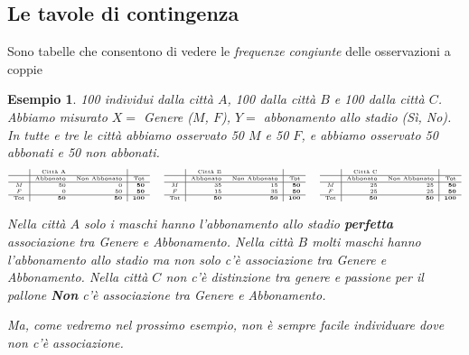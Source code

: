\documentclass[
  11pt,
]{book}
\theoremstyle{mytheoremstyle}
\theoremstyle{mydefstyle}
\newtheorem{example}{{Esempio}}[section]
\begin{document}
\subsection{Le tavole di contingenza}\label{le-tavole-di-contingenza}

Sono tabelle che consentono di vedere le \emph{frequenze congiunte} delle osservazioni a coppie

\begin{example}
100 individui dalla città \(A\), 100 dalla città \(B\) e 100 dalla città \(C\).
Abbiamo misurato \(X=\) Genere (\(M\), \(F\)), \(Y=\) abbonamento allo stadio (Sì, No).
In tutte e tre le città abbiamo osservato 50 \(M\) e 50 \(F\), e abbiamo osservato 50 abbonati
e 50 non abbonati.
\[\tiny
\begin{array}{c|rr|r}
 & \text{Città A} & &\\ \hline
 &\text{Abbonato} &\text{Non Abbonato} &\bf\text{Tot}\\
  \hline
   M & 50 & 0 & \bf 50\\ 
   F & 0 & 50  &\bf 50\\ \hline
  \bf\text{Tot} &\bf 50 &\bf 50 &\bf 100\\ 
\end{array}
\qquad
\begin{array}{c|rr|r}
 & \text{Città B} & &\\ \hline
 &\text{Abbonato} &\text{Non Abbonato} &\bf\text{Tot}\\
  \hline
  M & 35 & 15 & \bf50\\ 
  F & 15 & 35  &\bf50\\ \hline
  \bf\text{Tot} &\bf 50 &\bf 50 &\bf 100\\ 
\end{array}
\qquad
\begin{array}{c|rr|r}
 & \text{Città C} & &\\ \hline
 &\text{Abbonato} &\text{Non Abbonato} &\bf\text{Tot}\\
  \hline
  M & 25 & 25 & \bf50\\ 
  F & 25 & 25  &\bf50\\ \hline
  \bf\text{Tot} &\bf 50 &\bf 50 &\bf 100\\ 
\end{array}
\]

Nella città \(A\) solo i maschi hanno l'abbonamento allo stadio
\textbf{perfetta} associazione tra Genere e Abbonamento.
Nella città \(B\) molti maschi hanno l'abbonamento allo stadio ma non solo
c'è associazione tra Genere e Abbonamento.
Nella città \(C\) non c'è distinzione tra genere e passione per il pallone
\textbf{Non} c'è associazione tra Genere e Abbonamento.

Ma, come vedremo nel prossimo esempio, non è sempre facile individuare dove non c'è associazione.
\end{example}
\end{document}
